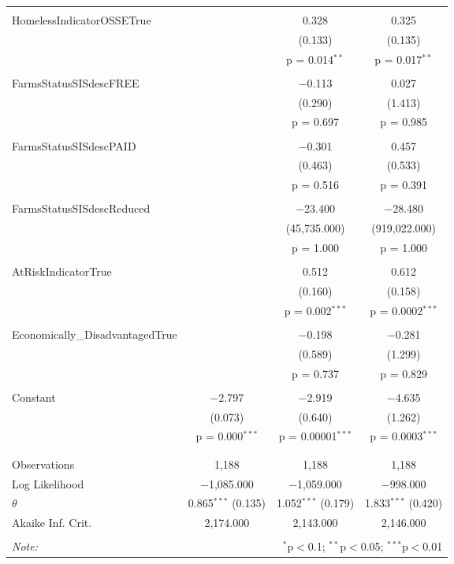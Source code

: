 \begin{table}[!htbp]
\begin{tabular}{@{\extracolsep{5pt}}lccc}
  & & & \\ 
 HomelessIndicatorOSSETrue &  & 0.328 & 0.325 \\ 
  &  & (0.133) & (0.135) \\ 
  &  & p = 0.014$^{**}$ & p = 0.017$^{**}$ \\ 
  & & & \\ 
 FarmsStatusSISdescFREE &  & $-$0.113 & 0.027 \\ 
  &  & (0.290) & (1.413) \\ 
  &  & p = 0.697 & p = 0.985 \\ 
  & & & \\ 
 FarmsStatusSISdescPAID &  & $-$0.301 & 0.457 \\ 
  &  & (0.463) & (0.533) \\ 
  &  & p = 0.516 & p = 0.391 \\ 
  & & & \\ 
 FarmsStatusSISdescReduced &  & $-$23.400 & $-$28.480 \\ 
  &  & (45,735.000) & (919,022.000) \\ 
  &  & p = 1.000 & p = 1.000 \\ 
  & & & \\ 
 AtRiskIndicatorTrue &  & 0.512 & 0.612 \\ 
  &  & (0.160) & (0.158) \\ 
  &  & p = 0.002$^{***}$ & p = 0.0002$^{***}$ \\ 
  & & & \\ 
 Economically\_DisadvantagedTrue &  & $-$0.198 & $-$0.281 \\ 
  &  & (0.589) & (1.299) \\ 
  &  & p = 0.737 & p = 0.829 \\ 
  & & & \\ 
 Constant & $-$2.797 & $-$2.919 & $-$4.635 \\ 
  & (0.073) & (0.640) & (1.262) \\ 
  & p = 0.000$^{***}$ & p = 0.00001$^{***}$ & p = 0.0003$^{***}$ \\ 
  & & & \\ 
\hline \\[-1.8ex] 
Observations & 1,188 & 1,188 & 1,188 \\ 
Log Likelihood & $-$1,085.000 & $-$1,059.000 & $-$998.000 \\ 
$\theta$ & 0.865$^{***}$  (0.135) & 1.052$^{***}$  (0.179) & 1.833$^{***}$  (0.420) \\ 
Akaike Inf. Crit. & 2,174.000 & 2,143.000 & 2,146.000 \\ 
\hline 
\hline \\[-1.8ex] 
\textit{Note:}  & \multicolumn{3}{r}{$^{*}$p$<$0.1; $^{**}$p$<$0.05; $^{***}$p$<$0.01} \\ 
\end{tabular} 
\end{table} 
